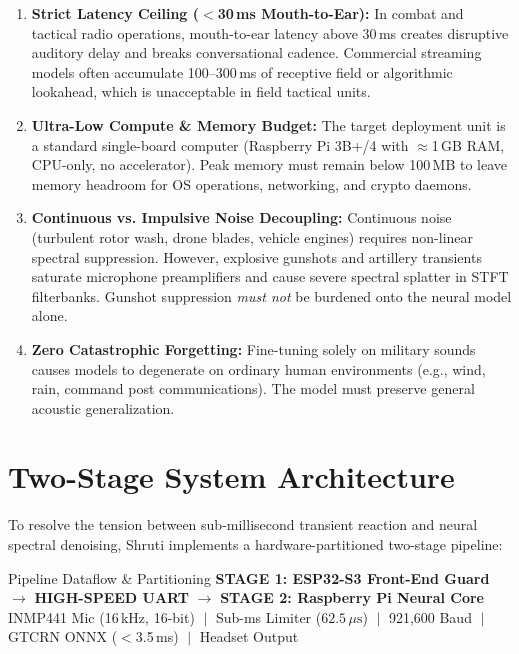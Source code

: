 \documentclass[11pt,a4paper]{article}
\begin{document}
\begin{enumerate}
    \item \textbf{Strict Latency Ceiling ($<$30\,ms Mouth-to-Ear):} In combat and tactical radio operations, mouth-to-ear latency above 30\,ms creates disruptive auditory delay and breaks conversational cadence. Commercial streaming models often accumulate 100--300\,ms of receptive field or algorithmic lookahead, which is unacceptable in field tactical units.
    \item \textbf{Ultra-Low Compute \& Memory Budget:} The target deployment unit is a standard single-board computer (Raspberry Pi 3B+/4 with $\approx$1\,GB RAM, CPU-only, no accelerator). Peak memory must remain below 100\,MB to leave memory headroom for OS operations, networking, and crypto daemons.
    \item \textbf{Continuous vs. Impulsive Noise Decoupling:} Continuous noise (turbulent rotor wash, drone blades, vehicle engines) requires non-linear spectral suppression. However, explosive gunshots and artillery transients saturate microphone preamplifiers and cause severe spectral splatter in STFT filterbanks. Gunshot suppression \textit{must not} be burdened onto the neural model alone.
    \item \textbf{Zero Catastrophic Forgetting:} Fine-tuning solely on military sounds causes models to degenerate on ordinary human environments (e.g., wind, rain, command post communications). The model must preserve general acoustic generalization.
\end{enumerate}

\section{Two-Stage System Architecture}

To resolve the tension between sub-millisecond transient reaction and neural spectral denoising, Shruti implements a hardware-partitioned two-stage pipeline:

\begin{calloutbox}[navyprimary]{Pipeline Dataflow \& Partitioning}
\centering
\textbf{STAGE 1: ESP32-S3 Front-End Guard} $\longrightarrow$ \textbf{HIGH-SPEED UART} $\longrightarrow$ \textbf{STAGE 2: Raspberry Pi Neural Core}\\
\vspace{2pt}
{\small INMP441 Mic (16\,kHz, 16-bit) $\;\vert\;$ Sub-ms Limiter ($62.5\,\mu\text{s}$) $\;\vert\;$ 921,600 Baud $\;\vert\;$ GTCRN ONNX ($<$3.5\,ms) $\;\vert\;$ Headset Output}
\end{calloutbox}
\end{document}
